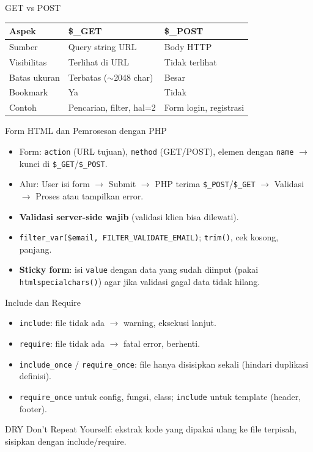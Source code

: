 \documentclass[handout]{beamer}
\begin{document}
\begin{frame}{GET vs POST}
	\small
	\begin{tabular}{|l|l|l|}
		\hline
		\textbf{Aspek} & \textbf{\$\_GET} & \textbf{\$\_POST} \\
		\hline
		Sumber & Query string URL & Body HTTP \\
		\hline
		Visibilitas & Terlihat di URL & Tidak terlihat \\
		\hline
		Batas ukuran & Terbatas ($\sim$2048 char) & Besar \\
		\hline
		Bookmark & Ya & Tidak \\
		\hline
		Contoh & Pencarian, filter, hal=2 & Form login, registrasi \\
		\hline
	\end{tabular}
\end{frame}

\begin{frame}{Form HTML dan Pemrosesan dengan PHP}
	\begin{itemize}
		\item Form: \texttt{action} (URL tujuan), \texttt{method} (GET/POST), elemen dengan \texttt{name} $\to$ kunci di \texttt{\$\_GET}/\texttt{\$\_POST}.
		\item Alur: User isi form $\to$ Submit $\to$ PHP terima \texttt{\$\_POST}/\texttt{\$\_GET} $\to$ Validasi $\to$ Proses atau tampilkan error.
		\item \textbf{Validasi server-side wajib} (validasi klien bisa dilewati).
		\item \texttt{filter\_var(\$email, FILTER\_VALIDATE\_EMAIL)}; \texttt{trim()}, cek kosong, panjang.
		\item \textbf{Sticky form}: isi \texttt{value} dengan data yang sudah diinput (pakai \texttt{htmlspecialchars()}) agar jika validasi gagal data tidak hilang.
	\end{itemize}
\end{frame}

\begin{frame}{Include dan Require}
	\begin{itemize}
		\item \texttt{include}: file tidak ada $\to$ warning, eksekusi lanjut.
		\item \texttt{require}: file tidak ada $\to$ fatal error, berhenti.
		\item \texttt{include\_once} / \texttt{require\_once}: file hanya disisipkan sekali (hindari duplikasi definisi).
		\item \texttt{require\_once} untuk config, fungsi, class; \texttt{include} untuk template (header, footer).
	\end{itemize}
	\begin{block}{DRY}
		Don't Repeat Yourself: ekstrak kode yang dipakai ulang ke file terpisah, sisipkan dengan include/require.
	\end{block}
\end{frame}
\end{document}
